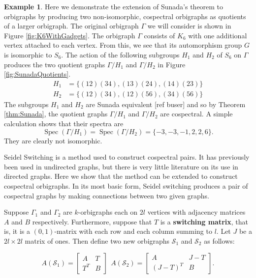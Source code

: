 \documentclass[12pt]{article}
\theoremstyle{plain}
\theoremstyle{definition}
\newtheorem{example}[theorem]{Example}
\theoremstyle{remark}
\DeclareMathOperator*{\spec}{Spec}
\begin{document}
  \begin{example}
    Here we demonstrate the extension of Sunada's theorem to orbigraphs by producing two non-isomorphic, cospectral orbigraphs as quotients of a larger orbigraph. The original orbigraph $\Gamma$ we will consider is shown in Figure \ref{fig:K6WithGadgets}. The orbigraph $\Gamma$ consists of $K_6$ with one additional vertex attached to each vertex. From this, we see that its automorphism group $G$ is isomorphic to $S_6$. The action of the following subgroups $H_1$ and $H_2$ of $S_6$ on $\Gamma$ produces the two quotient graphs $\Gamma / H_1$ and $\Gamma / H_2$ in Figure \ref{fig:SunadaQuotients}.
    \begin{align*}
      H_1 &= \{ (12)(34), (13)(24), (14)(23) \} \\
      H_2 &= \{ (12)(34), (12)(56), (34)(56) \}
    \end{align*}
    The subgroups $H_1$ and $H_2$ are Sunada equivalent [ref buser] and so by Theorem \ref{thm:Sunada}, the quotient graphs $\Gamma / H_1$ and $\Gamma / H_2$ are cospectral. A simple calculation shows that their spectra are %
    $$
    \spec(\Gamma / H_1) = \spec(\Gamma / H_2) = \{ -3, -3, -1, 2, 2, 6 \}.
    $$
    They are clearly not isomorphic.
  \end{example}

  Seidel Switching is a method used to construct cospectral pairs. It has previously been used in undirected graphs, but there is very little literature on its use in directed graphs. Here we show that the method can be extended to construct cospectral orbigraphs. In its most basic form, Seidel switching produces a pair of cospectral graphs by making connections between two given graphs. 

  Suppose $\Gamma_1$ and $\Gamma_2$ are $k$-orbigraphs each on $2l$ vertices with adjacency matrices $A$ and $B$ respectively. Furthermore, suppose that $T$ is a \textbf{switching matrix}, that is, it is a $(0,1)$-matrix with each row and each column summing to $l$. Let $J$ be a $2l \times 2l$ matrix of ones. Then define two new orbigraphs $\mathcal{S}_1$ and $\mathcal{S}_2$ as follows:

  $$
  A(\mathcal{S}_1) = \begin{bmatrix}
      A & T \\
      T^T & B
  \end{bmatrix} \ \ 
  A(\mathcal{S}_2) = \begin{bmatrix}
      A & J - T \\
      (J - T)^T & B
  \end{bmatrix}.
  $$
\end{document}
